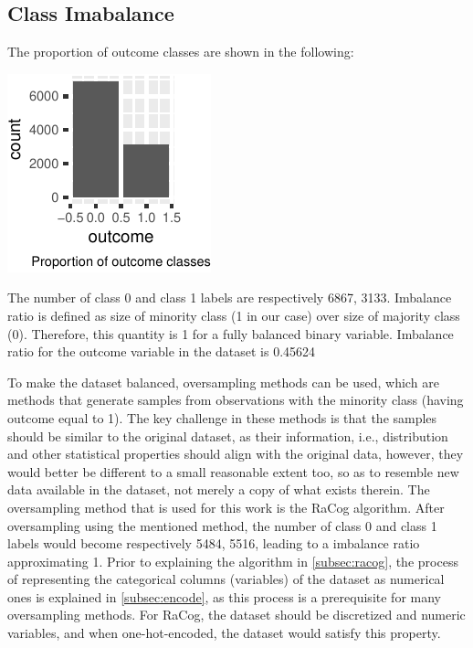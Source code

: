 \documentclass{article}
\begin{document}
\hypertarget{class-imabalance}{%
\subsection{\texorpdfstring{Class Imabalance
\label{subsec:imbalance}}{Class Imabalance }}\label{class-imabalance}}

The proportion of outcome classes are shown in the following:

\begin{center}\includegraphics{report_files/figure-latex/unnamed-chunk-8-1} \end{center}

The number of class 0 and class 1 labels are respectively 6867, 3133.
Imbalance ratio is defined as size of minority class (1 in our case)
over size of majority class (0). Therefore, this quantity is 1 for a
fully balanced binary variable. Imbalance ratio for the outcome variable
in the dataset is 0.45624

To make the dataset balanced, oversampling methods can be used, which
are methods that generate samples from observations with the minority
class (having outcome equal to 1). The key challenge in these methods is
that the samples should be similar to the original dataset, as their
information, i.e., distribution and other statistical properties should
align with the original data, however, they would better be different to
a small reasonable extent too, so as to resemble new data available in
the dataset, not merely a copy of what exists therein. The oversampling
method that is used for this work is the RaCog algorithm. After
oversampling using the mentioned method, the number of class 0 and class
1 labels would become respectively 5484, 5516, leading to a imbalance
ratio approximating 1. Prior to explaining the algorithm in
\ref{subsec:racog}, the process of representing the categorical columns
(variables) of the dataset as numerical ones is explained in
\ref{subsec:encode}, as this process is a prerequisite for many
oversampling methods. For RaCog, the dataset should be discretized and
numeric variables, and when one-hot-encoded, the dataset would satisfy
this property.
\end{document}
